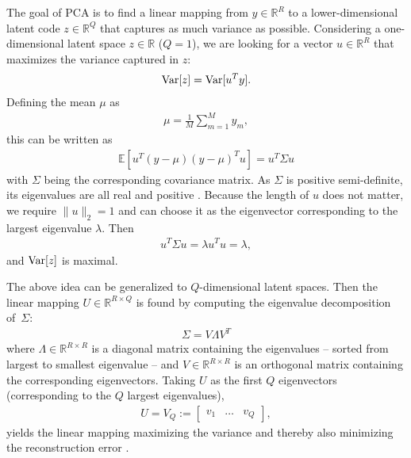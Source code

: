 \begin{example}
  \label{ex:shape-prior-pca}
  The goal of PCA is to find a linear mapping from $y \in \mathbb{R}^R$ to
  a lower-dimensional latent code $z \in \mathbb{R}^Q$
  that captures as much variance as possible.
  Considering a one-dimensional latent space $z \in \mathbb{R}$ ($Q = 1$),
  we are looking for a vector $u \in \mathbb{R}^R$ that maximizes
  the variance captured in $z$:
  \begin{align}
    \mathrm{Var}[z] = \mathrm{Var}[u^Ty].
  \end{align}
  Defining the mean $\mu$ as
  \begin{align}
    \mu = \frac{1}{M} \sum_{m = 1}^M y_m\label{eq:shape-prior-pca-mean},
  \end{align}
  this can be written as
  \begin{align}
    \mathbb{E}[u^T(y - \mu)(y - \mu)^Tu] = u^T \Sigma u\label{eq:shape-prior-pca-sigma}
  \end{align}
  with $\Sigma$ being the corresponding covariance matrix. As $\Sigma$ is
  positive semi-definite, its eigenvalues are all real and positive
  \cite[Section~1.13, Theorem~4 and Theorem~8]{MagnusNeudecker:1999}. Because
  the length of $u$ does not matter, we require $\|u\|_2 = 1$ and can choose
  it as the eigenvector corresponding to the largest eigenvalue $\lambda$. Then
  \begin{align}
    u^T \Sigma u = \lambda u^T u = \lambda,
  \end{align}
  and $\mathrm{Var}[z]$ is maximal.
  
  The above idea can be generalized to $Q$-dimensional latent spaces. Then
  the linear mapping $U \in \mathbb{R}^{R \times Q}$ is found by computing
  the eigenvalue decomposition
  \cite[Section~1.14, Theorem~13]{MagnusNeudecker:1999} of~$\Sigma$:
  \begin{align}
    \Sigma = V \Lambda V^T\label{eq:shape-prior-lambda}
  \end{align}
  where $\Lambda \in \mathbb{R}^{R \times R}$ is a diagonal matrix containing
  the eigenvalues -- sorted from largest to smallest eigenvalue -- and
  $V \in \mathbb{R}^{R \times R}$ is an orthogonal matrix containing
  the corresponding eigenvectors. Taking $U$ as the first $Q$ eigenvectors
  (corresponding to the $Q$ largest eigenvalues), \ie
  \begin{align}
    U = V_Q := \left[\begin{matrix}v_1 &\ldots& v_Q\end{matrix}\right],
  \end{align}
  yields the linear mapping maximizing the variance and thereby
  also minimizing the reconstruction error \cite[Section~12.1]{Bishop:2006}.
\end{example}

